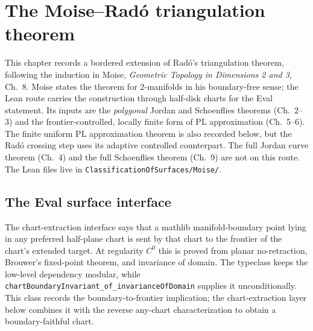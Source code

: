 %

\chapter{The Moise--Rad\'o triangulation theorem}

This chapter records a bordered extension of Rad\'o's triangulation theorem,
following the induction in Moise, \emph{Geometric Topology in Dimensions 2
and 3}, Ch.~8.  Moise states the theorem for $2$-manifolds in his
boundary-free sense; the Lean route carries the construction through
half-disk charts for the Eval statement.  Its inputs are the
\emph{polygonal} Jordan and Schoenflies theorems (Ch.~2--3) and the
frontier-controlled, locally finite form of PL approximation (Ch.~5--6).
The finite uniform PL approximation theorem is also recorded below, but the
Rad\'o crossing step uses its adaptive controlled counterpart.  The full
Jordan curve theorem (Ch.~4) and the full Schoenflies theorem (Ch.~9) are not
on this route.  The Lean files live in
\texttt{ClassificationOfSurfaces/Moise/}.

\section{The Eval surface interface}

\begin{definition}
\label{moise:def:chart_boundary_invariant}
\leanok
The chart-extraction interface says that a mathlib manifold-boundary point
lying in any preferred half-plane chart is sent by that chart to the frontier of
the chart's extended target.  At regularity $C^0$ this is proved from planar
no-retraction, Brouwer's fixed-point theorem, and invariance of domain.  The
typeclass keeps the low-level dependency modular, while
\texttt{chartBoundaryInvariant\_of\_invarianceOfDomain} supplies it
unconditionally.  This class records the boundary-to-frontier implication;
the chart-extraction layer below combines it with the reverse any-chart
characterization to obtain a boundary-faithful chart.
\end{definition}

